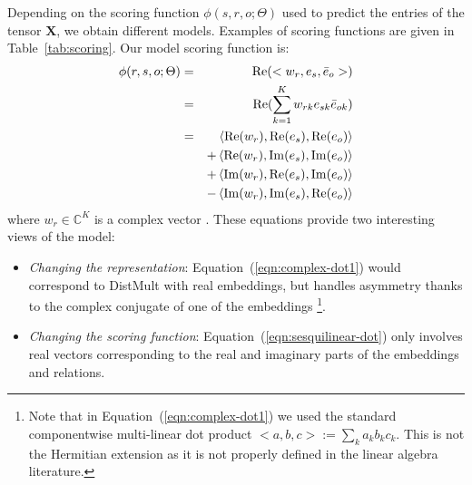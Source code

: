 \documentclass{article}
\newcommand{\complexSpace}{\mathbb{C}}
\newcommand{\C}{\complexSpace} %
\newcommand{\real}{\mathrm{Re}}
\newcommand{\imag}{\mathrm{Im}}
\newcommand{\Relation}{\mathbf{X}}
\newcommand{\rank}{K} %
\newcommand{\eemb}{e} %
\newcommand{\wemb}{w} %
\begin{document}
Depending on the scoring function $\phi(s,r,o;\Theta)$ used to predict the entries of the
tensor $\Relation$, we obtain different models. Examples of scoring functions are given in Table~\ref{tab:scoring}. Our model scoring function is:
\begin{eqnarray}
    \phi(r,s,o;\Theta) &=& \real(<w_{r}, \eemb_s, \bar\eemb_o>)\\
    \label{eqn:complex-dot1}
    &=& \real(\sum_{k=1}^K w_{rk} \eemb_{sk} \bar\eemb_{ok})\\
    \label{eqn:complex-dot}
    &=& \left<\real(w_r),\real(e_s), \real(e_o)\right>\notag\\
    &&+ \left<\real(w_r),\imag(e_s), \imag(e_o)\right> \notag\\
    &&+ \left<\imag(w_r), \real(e_s),\imag(e_o)\right> \notag\\
    &&- \left<\imag(w_r),\imag(e_s),\real(e_o)\right>
    \label{eqn:sesquilinear-dot}
\end{eqnarray}
where $w_r\in \C^K$ is a complex vector . These equations provide two interesting views of the model:
\begin{itemize}
    \item \emph{Changing the representation}: Equation~(\ref{eqn:complex-dot1}) would correspond to DistMult with real embeddings, but handles asymmetry thanks to the complex conjugate of one of the embeddings%
    \footnote{Note that in Equation~(\ref{eqn:complex-dot1}) we used the standard componentwise multi-linear dot product $<a,b,c> := \sum_k a_kb_kc_k$. This is not 
    the Hermitian extension as it is not properly defined in the linear algebra literature.}.
    \item  \emph{Changing the scoring function}: Equation~(\ref{eqn:sesquilinear-dot}) only involves real vectors corresponding to the real and imaginary parts of the embeddings and relations.%
\end{itemize}
\end{document}

